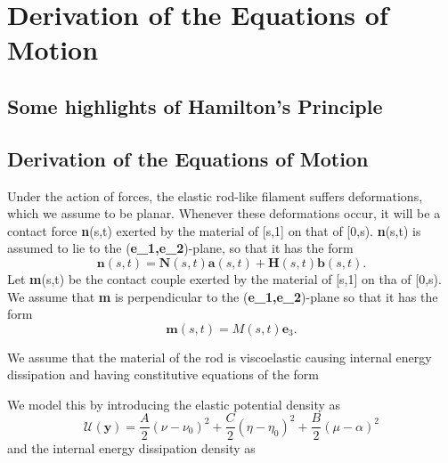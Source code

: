 \documentclass[12pt]{article}
\newcommand{\cB}{B}
\newcommand{\cA}{A}
\newcommand{\cC}{C}
\begin{document}
\section{Derivation of the Equations of Motion
}\label{Derivation of the Equations of Motion
}
\subsection{Some highlights of Hamilton's Principle}
\subsection{Derivation of the Equations of Motion}
Under the action of forces, the elastic rod-like filament suffers deformations, which we assume to be planar. Whenever these deformations occur, it will be a contact force \textbf{n}(s,t) exerted by the material of [s,1] on that of [0,s). \textbf{n}(s,t) is assumed to lie to the (\textbf{e_1,e_2})-plane, so that it has the form
\[  \textbf{n}(s,t)= \textbf{N} (s,t) \textbf{a}(s,t) + \textbf{H} (s,t) \textbf{b} (s,t).
\]
Let \textbf{m}(s,t) be the contact couple exerted by the material of [s,1] on tha of [0,s). We assume that \textbf{m} is perpendicular to the (\textbf{e_1,e_2})-plane so that it has the form
\[ 
\textbf{m}(s,t) = M(s,t)\textbf{e}_3.
\]

We assume that the material of the rod is viscoelastic causing internal energy dissipation and having constitutive equations of the form

We model this by introducing the elastic potential density  as
\[ \mathcal{U}(\textbf{y}) = \frac{\cA}{2} (\nu - \nu_0)^2
+\frac{\cC}{2} (\eta - \eta_0 )^2
+\frac{\cB}{2} (\mu -\alpha)^2 
\]
and the internal energy dissipation density as

\]
\end{document}
